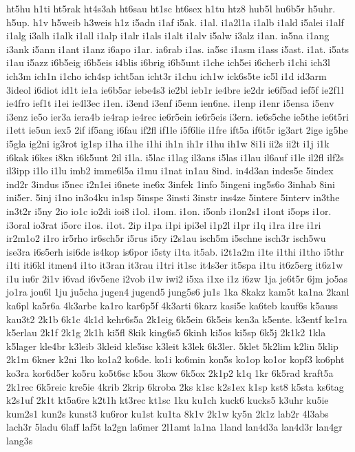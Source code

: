 {ht5hu
h1ti
ht5rak
ht4s3ah
ht6sau
ht1sc
ht6sex
h1tu
htz8
hub5l
hu6b5r
h5uhr.
h5up.
h1v
h5weib
h3weis
h1z
i5adn
i1af
i5ak.
i1al.
i1a2l1a
i1alb
i1ald
i5alei
i1alf
i1alg
i3alh
i1alk
i1all
i1alp
i1alr
i1als
i1alt
i1alv
i5alw
i3alz
i1an.
ia5na
i1ang
i3ank
i5ann
i1ant
i1anz
i6apo
i1ar.
ia6rab
i1as.
ia5sc
i1asm
i1ass
i5ast.
i1at.
i5ats
i1au
i5azz
i6b5eig
i6b5eis
i4blis
i6brig
i6b5unt
i1che
ich5ei
i6cherb
i1chi
ich3l
ich3m
ich1n
i1cho
ich4sp
icht5an
icht3r
i1chu
ich1w
ick6s5te
ic5l
i1d
id3arm
3ideol
i6diot
id1t
ie1a
ie6b5ar
iebe4s3
ie2bl
ieb1r
ie4bre
ie2dr
ie6f5ad
ief5f
ie2f1l
ie4fro
ief1t
i1ei
ie4l3ec
i1en.
i3end
i3enf
i5enn
ien6ne.
i1enp
i1enr
i5ensa
i5env
i3enz
ie5o
ier3a
iera4b
ie4rap
ie4rec
ie6r5ein
ie6r5eis
i3ern.
ie6s5che
ie5the
ie6t5ri
i1ett
ie5un
iex5
2if
if5ang
i6fau
if2fl
if1le
i5f6lie
i1fre
ift5a
if6t5r
ig3art
2ige
ig5he
i5gla
ig2ni
ig3rot
ig1sp
i1ha
i1he
i1hi
ih1n
ih1r
i1hu
ih1w
8i1i
ii2s
ii2t
i1j
i1k
i6kak
i6kes
i8kn
i6k5unt
2il
i1la.
i5lac
i1lag
il3ans
i5las
i1lau
il6auf
i1le
il2fl
ilf2s
il3ipp
i1lo
i1lu
imb2
imme6l5a
i1mu
i1nat
in1au
8ind.
in4d3an
indes5e
5index
ind2r
3indus
i5nec
i2n1ei
i6nete
ine6x
3infek
1info
5ingeni
ing5s6o
3inhab
8ini
ini5er.
5inj
i1no
in3o4ku
in1sp
5inspe
3insti
3instr
ins4ze
5intere
5interv
in3the
in3t2r
i5ny
2io
io1c
io2di
ioi8
i1ol.
i1om.
i1on.
i5onb
i1on2s1
i1ont
i5ops
i1or.
i3oral
io3rat
i5orc
i1os.
i1ot.
2ip
i1pa
i1pi
ipi3el
i1p2l
i1pr
i1q
i1ra
i1re
i1ri
ir2m1o2
i1ro
ir5rho
ir6sch5r
i5rus
i5ry
i2s1au
isch5m
i5schne
isch3r
isch5wu
ise3ra
i6s5erh
isi6de
is4kop
is6por
i5sty
i1ta
it5ab.
i2t1a2m
i1te
i1thi
i1tho
i5thr
i1ti
iti6kl
itmen4
i1to
it3ran
it3rau
i1tri
it1sc
it4s3er
it5spa
i1tu
it6z5erg
it6z1w
i1u
iu6r
2i1v
i6vad
i6v5ene
i2vob
i1w
iwi2
i5xa
i1xe
i1z
i6zw
1ja
je6t5r
6jm
jo5as
jo1ra
jou6l
1ju
ju5cha
jugen4
jugend5
jung5s6
ju1s
1ka
8kakz
kam5t
ka1na
2kanl
ka6pl
ka5r6a
4k3arbe
ka1ro
kar6p5f
4k3arti
6karz
kasi5e
ka6teb
kauf6s
k5auss
kau3t2
2k1b
6k1c
4k1d
kehr6s5a
2k1eig
6k5ein
6k5eis
ken3a
k5ente.
k3entf
ke1ra
k5erlau
2k1f
2k1g
2k1h
ki5fl
8kik
king6s5
6kinh
ki5os
ki5sp
6k5j
2k1k2
1kla
k5lager
kle4br
k3leib
3kleid
kle5isc
k3leit
k3lek
6k3ler.
5klet
5k2lim
k2lin
5klip
2k1m
6kner
k2ni
1ko
ko1a2
ko6de.
ko1i
ko6min
kon5s
ko1op
ko1or
kopf3
ko6pht
ko3ra
kor6d5er
ko5ru
ko5t6sc
k5ou
3kow
6k5ox
2k1p2
k1q
1kr
6k5rad
kraft5a
2k1rec
6k5reic
kre5ie
4krib
2krip
6kroba
2ks
k1sc
k2s1ex
k1sp
kst8
k5sta
ks6tag
k2s1uf
2k1t
kt5a6re
k2t1h
kt3rec
kt1sc
1ku
ku1ch
kuck6
kucks5
k3uhr
ku5ie
kum2s1
kun2s
kunst3
ku6ror
ku1st
ku1ta
8k1v
2k1w
ky5n
2k1z
lab2r
4l3abs
lach3r
5ladu
6laff
laf5t
la2gn
la6mer
2l1amt
la1na
1land
lan4d3a
lan4d3r
lan4gr
lang3s
}
